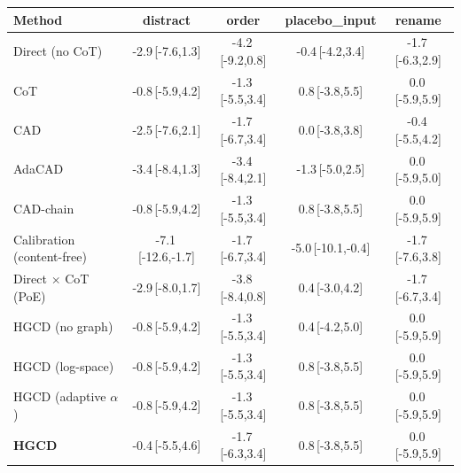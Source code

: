 \begin{tabular}{lcccc}
\toprule
Method & distract & order & placebo\_input & rename \\
\midrule
Direct (no CoT) & -2.9\,{\scriptsize[-7.6,1.3]} & -4.2\,{\scriptsize[-9.2,0.8]} & -0.4\,{\scriptsize[-4.2,3.4]} & -1.7\,{\scriptsize[-6.3,2.9]} \\
CoT & -0.8\,{\scriptsize[-5.9,4.2]} & -1.3\,{\scriptsize[-5.5,3.4]} & 0.8\,{\scriptsize[-3.8,5.5]} & 0.0\,{\scriptsize[-5.9,5.9]} \\
CAD & -2.5\,{\scriptsize[-7.6,2.1]} & -1.7\,{\scriptsize[-6.7,3.4]} & 0.0\,{\scriptsize[-3.8,3.8]} & -0.4\,{\scriptsize[-5.5,4.2]} \\
AdaCAD & -3.4\,{\scriptsize[-8.4,1.3]} & -3.4\,{\scriptsize[-8.4,2.1]} & -1.3\,{\scriptsize[-5.0,2.5]} & 0.0\,{\scriptsize[-5.9,5.0]} \\
CAD-chain & -0.8\,{\scriptsize[-5.9,4.2]} & -1.3\,{\scriptsize[-5.5,3.4]} & 0.8\,{\scriptsize[-3.8,5.5]} & 0.0\,{\scriptsize[-5.9,5.9]} \\
Calibration (content-free) & -7.1\,{\scriptsize[-12.6,-1.7]} & -1.7\,{\scriptsize[-6.7,3.4]} & -5.0\,{\scriptsize[-10.1,-0.4]} & -1.7\,{\scriptsize[-7.6,3.8]} \\
Direct $\times$ CoT (PoE) & -2.9\,{\scriptsize[-8.0,1.7]} & -3.8\,{\scriptsize[-8.4,0.8]} & 0.4\,{\scriptsize[-3.0,4.2]} & -1.7\,{\scriptsize[-6.7,3.4]} \\
HGCD (no graph) & -0.8\,{\scriptsize[-5.9,4.2]} & -1.3\,{\scriptsize[-5.5,3.4]} & 0.4\,{\scriptsize[-4.2,5.0]} & 0.0\,{\scriptsize[-5.9,5.9]} \\
HGCD (log-space) & -0.8\,{\scriptsize[-5.9,4.2]} & -1.3\,{\scriptsize[-5.5,3.4]} & 0.8\,{\scriptsize[-3.8,5.5]} & 0.0\,{\scriptsize[-5.9,5.9]} \\
HGCD (adaptive $\alpha$) & -0.8\,{\scriptsize[-5.9,4.2]} & -1.3\,{\scriptsize[-5.5,3.4]} & 0.8\,{\scriptsize[-3.8,5.5]} & 0.0\,{\scriptsize[-5.9,5.9]} \\
\textbf{HGCD} & -0.4\,{\scriptsize[-5.5,4.6]} & -1.7\,{\scriptsize[-6.3,3.4]} & 0.8\,{\scriptsize[-3.8,5.5]} & 0.0\,{\scriptsize[-5.9,5.9]} \\
\bottomrule
\end{tabular}
